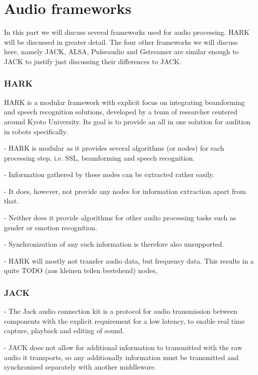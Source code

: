 
\section{Audio frameworks}
In this part we will discuss several frameworks used for audio processing.
HARK will be discussed in greater detail.
The four other frameworks we will discuss here, namely JACK, ALSA, Pulseaudio and Gstreamer are similar enough to JACK to justify just discussing their differences to JACK.

\subsubsection{HARK}
HARK is a modular framework with explicit focus on integrating beamforming and speech recognition solutions, developed by a team of researcher centered around Kyoto University. %
Its goal is to provide an all in one solution for audition in robots specifically.


- HARK is modular as it provides several algorithms (or nodes) for each processing step, i.e. SSL, beamforming and speech recognition.

- Information gathered by these nodes can be extracted rather easily.

- It does, however, not provide any nodes for information extraction apart from that.

- Neither does it provide algorithms for other audio processing tasks such as gender or emotion recognition.

- Synchronization of any such information is therefore also unsupported.

- HARK will mostly not transfer audio data, but frequency data.
This results in a quite TODO (aus kleinen teilen bestehend) nodes, 




\subsubsection{JACK}
- The Jack audio connection kit \cite{JACK} is a protocol for audio transmission between components with the explicit requirement for a low latency, to enable real time capture, playback and editing of sound. 

- JACK does not allow for additional information to transmitted with the raw audio it transports, so any additionally information must be transmitted and synchronized separately with another middleware. 

